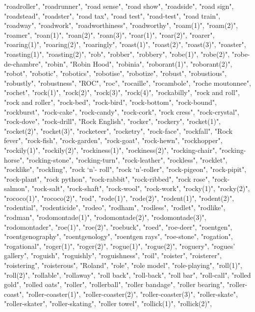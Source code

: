 "roadroller",
"roadrunner",
"road sense",
"road show",
"roadside",
"road sign",
"roadstead",
"roadster",
"road tax",
"road test",
"road-test",
"road train",
"roadway",
"roadwork",
"roadworthiness",
"roadworthy",
"roam(1)",
"roam(2)",
"roamer",
"roan(1)",
"roan(2)",
"roan(3)",
"roar(1)",
"roar(2)",
"roarer",
"roaring(1)",
"roaring(2)",
"roaringly",
"roast(1)",
"roast(2)",
"roast(3)",
"roaster",
"roasting(1)",
"roasting(2)",
"rob",
"robber",
"robbery",
"robe(1)",
"robe(2)",
"robe-de-chambre",
"robin",
"Robin Hood",
"robinia",
"roborant(1)",
"roborant(2)",
"robot",
"robotic",
"robotics",
"robotise",
"robotize",
"robust",
"robustious",
"robustly",
"robustness",
"ROC",
"roc",
"rocaille",
"rocambole",
"roche moutonnee",
"rochet",
"rock(1)",
"rock(2)",
"rock(3)",
"rock(4)",
"rockabilly",
"rock and roll",
"rock and roller",
"rock-bed",
"rock-bird",
"rock-bottom",
"rock-bound",
"rockburst",
"rock-cake",
"rock-candy",
"rock-cork",
"rock cress",
"rock-crystal",
"rock-dove",
"rock-drill",
"Rock English",
"rocker",
"rockery",
"rocket(1)",
"rocket(2)",
"rocket(3)",
"rocketeer",
"rocketry",
"rock-face",
"rockfall",
"Rock fever",
"rock-fish",
"rock-garden",
"rock-goat",
"rock-hewn",
"rockhopper",
"rockily(1)",
"rockily(2)",
"rockiness(1)",
"rockiness(2)",
"rocking-chair",
"rocking-horse",
"rocking-stone",
"rocking-turn",
"rock-leather",
"rockless",
"rocklet",
"rocklike",
"rockling",
"rock `n'- roll",
"rock `n'-roller",
"rock-pigeon",
"rock-pipit",
"rock-plant",
"rock python",
"rock-rabbit",
"rock-ribbed",
"rock rose",
"rock-salmon",
"rock-salt",
"rock-shaft",
"rock-wool",
"rock-work",
"rocky(1)",
"rocky(2)",
"rococo(1)",
"rococo(2)",
"rod",
"rode(1)",
"rode(2)",
"rodent(1)",
"rodent(2)",
"rodential",
"rodenticide",
"rodeo",
"rodham",
"rodless",
"rodlet",
"rodlike",
"rodman",
"rodomontade(1)",
"rodomontade(2)",
"rodomontade(3)",
"rodomontader",
"roe(1)",
"roe(2)",
"roebuck",
"roed",
"roe-deer",
"roentgen",
"roentgenography",
"roentgenology",
"roentgen rays",
"roe-stone",
"rogation",
"rogational",
"roger(1)",
"roger(2)",
"rogue(1)",
"rogue(2)",
"roguery",
"rogues' gallery",
"roguish",
"roguishly",
"roguishness",
"roil",
"roister",
"roisterer",
"roistering",
"roisterous",
"Roland",
"role",
"role model",
"role-playing",
"roll(1)",
"roll(2)",
"rollable",
"rollaway",
"roll back",
"roll-back",
"roll bar",
"roll-call",
"rolled gold",
"rolled oats",
"roller",
"rollerball",
"roller bandage",
"roller bearing",
"roller-coast",
"roller-coaster(1)",
"roller-coaster(2)",
"roller-coaster(3)",
"roller-skate",
"roller-skater",
"roller-skating",
"roller towel",
"rollick(1)",
"rollick(2)",
